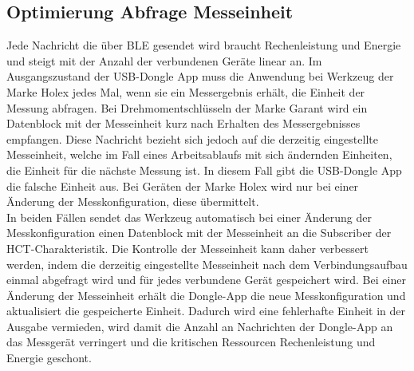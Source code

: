 \subsection{Optimierung Abfrage Messeinheit}
Jede Nachricht die über \ac{BLE} gesendet wird braucht Rechenleistung und Energie und steigt mit der Anzahl der verbundenen Geräte linear an. Im Ausgangszustand der \ac{USB}-Dongle App muss die Anwendung bei Werkzeug der Marke Holex jedes Mal, wenn sie ein Messergebnis erhält, die Einheit der Messung abfragen. Bei Drehmomentschlüsseln der Marke Garant wird ein Datenblock mit der Messeinheit kurz nach Erhalten des Messergebnisses empfangen. Diese Nachricht bezieht sich jedoch auf die derzeitig eingestellte Messeinheit, welche im Fall eines Arbeitsablaufs mit sich ändernden Einheiten, die Einheit für die nächste Messung ist. In diesem Fall gibt die \ac{USB}-Dongle App die falsche Einheit aus. Bei Geräten der Marke Holex wird nur bei einer Änderung der Messkonfiguration, diese übermittelt.\\
In beiden Fällen sendet das Werkzeug automatisch bei einer Änderung der Messkonfiguration einen Datenblock mit der Messeinheit an die Subscriber der \ac{HCT}-Charakteristik. Die Kontrolle der Messeinheit kann daher verbessert werden, indem die derzeitig eingestellte Messeinheit nach dem Verbindungsaufbau einmal abgefragt wird und für jedes verbundene Gerät gespeichert wird. Bei einer Änderung der Messeinheit erhält die Dongle-App die neue Messkonfiguration und aktualisiert die gespeicherte Einheit. Dadurch wird eine fehlerhafte Einheit in der Ausgabe vermieden, wird damit die Anzahl an Nachrichten der Dongle-App an das Messgerät verringert und die kritischen Ressourcen Rechenleistung und Energie geschont.

